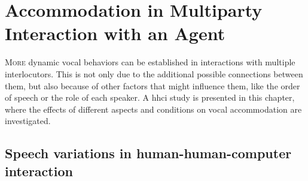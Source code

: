 \chapter{Accommodation in Multiparty Interaction with an Agent}
\label{chap:speech_variations_in_hhci}

\lettrine{M}{ore} dynamic vocal behaviors can be established in interactions with multiple interlocutors.
This is not only due to the additional possible connections between them, but also because of other factors that might influence them, like the order of speech or the role of each speaker.
A \acl{hhci} study is presented in this chapter, where the effects of different aspects and conditions on vocal accommodation are investigated.

\pagebreak

\acresetall

\section{Speech variations in human-human-computer interaction}
\label{sec:accommodation_in_multiparty_interaction_with_an_agent}

